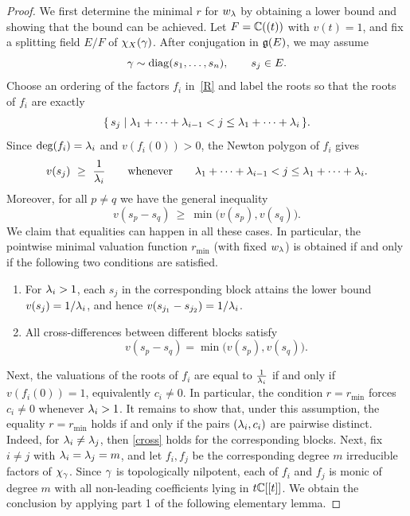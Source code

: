 \documentclass[11pt]{article}
\numberwithin{equation}{section}
\begin{document}
\begin{proof}

\smallskip
We first determine the minimal  $r$ for $w_\lambda$ by obtaining a lower bound and showing that the bound can be achieved. Let $F=\mathbb{C}((t))$ with $v(t)=1$, and fix a splitting field $E/F$ of $\chi_X(\gamma)$.
After conjugation in $\mathfrak{g}(E)$, we may assume
\[
\gamma \sim \operatorname{diag}(s_1,\dots,s_n),\qquad s_j\in E.
\]
Choose an ordering of the factors $f_i$ in~\eqref{R} and label the roots so that
the roots of $f_i$ are exactly
\[
\{\, s_j \mid \lambda_1+\cdots+\lambda_{i-1} < j \le \lambda_1+\cdots+\lambda_i \,\}.
\]
Since $\deg(f_i)=\lambda_i$ and $v(f_i(0))>0$, the Newton polygon of $f_i$ gives
\[
v(s_j)\ \ge\ \frac{1}{\lambda_i}
\qquad\text{whenever}\qquad
\lambda_1+\cdots+\lambda_{i-1} < j \le \lambda_1+\cdots+\lambda_i.
\]
Moreover, for all $p\neq q$ we have the general inequality
\[
v(s_p-s_q)\ \ge\ \min\bigl(v(s_p),v(s_q)\bigr).
\]
We claim that equalities can happen in all these cases. In particular, the pointwise minimal valuation function $r_{\min}$ (with fixed $w_\lambda$)
is obtained if and only if the following two conditions are satisfied.
\begin{enumerate}
    \item For $\lambda_i>1$, each $s_j$ in the corresponding block attains the lower bound $v(s_j)=1/\lambda_i$, and hence $v(s_{j_1}-s_{j_2})= 1/\lambda_i$.
    \item All cross-differences between different blocks satisfy
\begin{equation}\label{cross}
    v(s_p-s_q)=\min\bigl(v(s_p),v(s_q)\bigr).
\end{equation}

\end{enumerate}

Next, the valuations of the roots of $f_i$ are equal to $\frac{1}{\lambda_i}$ if and only if $v(f_i(0))=1$, equivalently $c_i\neq 0$. In particular, the condition $r=r_{\min}$ forces $c_i\neq 0$ whenever $\lambda_i>1$.
It remains to show that, under this assumption, the equality $r=r_{\min}$ holds
if and only if the pairs $(\lambda_i,c_i)$ are pairwise distinct. Indeed, for $\lambda_i\neq \lambda_j$, then \cref{cross} holds for the corresponding blocks. Next, fix $i\neq j$ with $\lambda_i=\lambda_j=m$, and let $f_i,f_j$ be the corresponding
degree $m$ irreducible factors of $\chi_\gamma$. Since $\gamma$ is topologically nilpotent, each of $f_i$ and $f_j$ is monic of degree $m$ with all non-leading coefficients lying in $t\mathbb{C}[[t]]$. We obtain the conclusion by applying part 1 of the following elementary lemma.
\end{proof}
\end{document}
